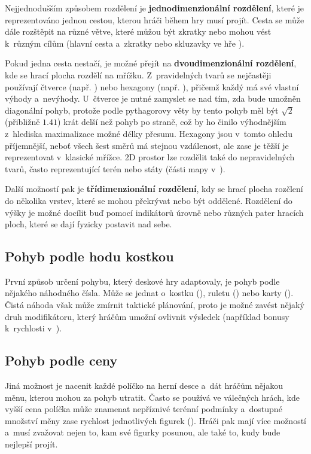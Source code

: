 Nejjednodušším způsobem rozdělení je \textbf{jednodimenzionální rozdělení}, které je reprezentováno jednou cestou, kterou hráči během hry musí projít. Cesta se může dále rozštěpit na různé větve, které můžou být zkratky nebo mohou vést k~různým cílům (hlavní cesta a~zkratky nebo skluzavky ve hře ).

Pokud jedna cesta nestačí, je možné přejít na \textbf{dvoudimenzionální rozdělení}, kde se hrací plocha rozdělí na mřížku. Z~pravidelných tvarů se nejčastěji používají čtverce (např. ) nebo hexagony (např. ), přičemž každý má své vlastní výhody a~nevýhody. U~čtverce je nutné zamyslet se nad tím, zda bude umožněn diagonální pohyb, protože podle pythagorovy věty by tento pohyb měl být $\sqrt{2}$ (přibližně $1.41$) krát delší než pohyb po straně, což by ho činilo výhodnějším z~hlediska maximalizace možné délky přesunu. Hexagony jsou v~tomto ohledu příjemnější, neboť všech šest směrů má stejnou vzdálenost, ale zase je těžší je reprezentovat v~klasické mřížce. 2D prostor lze rozdělit také do nepravidelných tvarů, často reprezentující terén nebo státy (části mapy v~).

Další možností pak je \textbf{třídimenzionální rozdělení}, kdy se hrací plocha rozčlení do několika vrstev, které se mohou překrývat nebo být oddělené. Rozdělení do výšky je možné docílit buď pomocí indikátorů úrovně nebo různých pater hracích ploch, které se dají fyzicky postavit nad sebe.

\subsection{Pohyb podle hodu kostkou}
\label{subsec:movement_roll_movement}

První způsob určení pohybu, který deskové hry adaptovaly, je pohyb podle nějakého náhodného čísla. Může se jednat o~kostku (), ruletu () nebo karty (). Čistá náhoda však může zmírnit taktické plánování, proto je možné zavést nějaký druh modifikátoru, který hráčům umožní ovlivnit výsledek (například bonusy k~rychlosti v~).

\subsection{Pohyb podle ceny}
\label{subsec:movement_cost_movement}

Jiná možnost je nacenit každé políčko na herní desce a~dát hráčům nějakou měnu, kterou mohou za pohyb utratit. Často se používá ve válečných hrách, kde vyšší cena políčka může znamenat nepříznivé terénní podmínky a~dostupné množství měny zase rychlost jednotlivých figurek (). Hráči pak mají více možností a~musí zvažovat nejen to, kam své figurky posunou, ale také to, kudy bude nejlepší projít.

